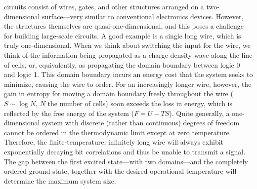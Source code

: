  circuits consist of wires, gates, and other structures arranged on a
two-dimensional surface---very similar to conventional electronics devices.
However, the structures themselves are quasi-one-dimensional, and this poses a
challenge for building large-scale  circuits. A good example is a
single long wire, which is truly one-dimensional. When we think about switching
the input for the wire, we think of the information being propagated as a charge
density wave along the line of cells, or, equivalently, as propagating the
domain boundary between logic 0 and logic 1. This domain boundary incurs an
energy cost that the system seeks to minimize, causing the wire to order. For an
increasingly longer wire, however, the gain in entropy for moving a domain
boundary freely throughout the wire ($S \sim \log N$, $N$ the number of cells)
soon exceeds the loss in energy, which is reflected by the free energy of the
system ($F = U - T S$). Quite generally, a one-dimensional system with discrete
(rather than continuous) degrees of freedom cannot be ordered in the
thermodynamic limit except at zero temperature. Therefore, the
finite-temperature, infinitely long wire will always exhibit exponentially
decaying bit correlations and thus be unable to transmit a signal. The gap
between the first excited state---with two domains---and the completely ordered
ground state, together with the desired operational temperature will determine
the maximum system size.

